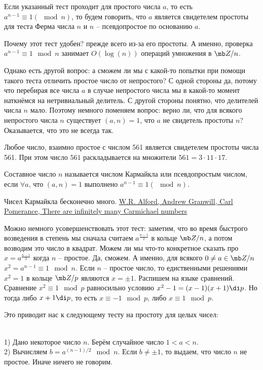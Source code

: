 \dfn Если указанный тест  проходит для простого числа $a$, то есть $a^{n-1}\equiv 1(\mod n)$, то будем говорить, что $a$ является свидетелем простоты для теста Ферма числа $n$ и $n$ -- псевдопростое по основанию $a$.
\edfn

Почему этот тест удобен? прежде всего из-за его простоты. А именно, проверка $a^{n-1}\equiv 1 \mod n$ занимает $O(\log(n))$ операций умножения в $\mb Z/n$. 

Однако есть другой вопрос: а сможем ли мы с какой-то попытки при помощи такого теста отличить простое число от непростого? С одной стороны да, потому что перебирая все числа $a$ в случае непростого числа мы в какой-то момент наткнёмся на нетривиальный делитель. С другой стороны понятно, что делителей числа $n$ мало. Поэтому немного поменяем вопрос: верно ли, что для всякого непростого числа $n$ существует $(a,n)=1$, что $a$ не свидетель простоты $n$? Оказывается, что это не всегда так.

\utv Любое число, взаимно простое с числом 561 является свидетелем простоты числа 561. При этом число $561$ раскладывается на множители $561=3\cdot 11\cdot 17$.
\eutv

\dfn Составное число $n$ называется числом Кармайкла или псевдопростым числом, если $\forall a$, что $(a,n)=1$ выполнено $a^{n-1}\equiv 1(\mod n)$.
\edfn



\fct Чисел Кармайкла бесконечно много. \href{http://www.dms.umontreal.ca/~andrew/PDF/carmichael.pdf}{W.R. Alford, Andrew Granwill, Carl Pomerance, There are infinitely many Carmichael numbers}
\efct

Можно немного усовершенствовать этот тест: заметим, что во время быстрого возведения в степень мы сначала считаем $a^{\frac{n-1}{2}} $ в кольце $\mb Z/n$, а потом возводим это число в квадрат. Можем ли мы что-то конкретное сказать про $x=a^{\frac{n-1}{2}}$ когда $n$ -- простое. Да, сможем. А именно, для всякого $0\neq a \in \mb Z/n$ $x^2=a^{n-1}\equiv 1 \mod n$.
\lm Если $n$ -- простое число, то едиственными решениями $x^2=1$ в кольце $\mb Z/p$ являются $x=\pm 1$.
\elm
\proof Распишем на языке сравнений. Сравнение $x^2\equiv 1 \mod p $ равносильно условию $x^2-1=(x-1)(x+1)\di p$. Но тогда либо $x+1\di p$, то есть $x\equiv -1 \mod p$, либо $x\equiv 1 \mod p$.
\endproof

Это приводит нас к следующему тесту на простоту для целых чисел:

\\
1) Дано некоторое число $n$. Берём случайное число $1<a<n$.\\
2) Вычисляем $b=a^{(n-1)/2} \mod n$. Если $b\neq \pm 1$, то выдаем, что число $n$ не простое. Иначе ничего не говорим.




